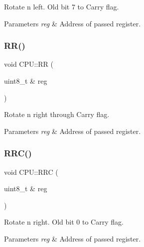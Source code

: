 Rotate n left. Old bit 7 to Carry flag. 


\begin{DoxyParams}{Parameters}
{\em reg} & Address of passed register. \\
\hline
\end{DoxyParams}
\mbox{\label{classCPU_ac1b7b67195fe563523a634dd0d6cbc17}} 
\subsubsection{\texorpdfstring{R\+R()}{RR()}}
{\footnotesize\ttfamily void C\+P\+U\+::\+RR (\begin{DoxyParamCaption}\item[{uint8\+\_\+t \&}]{reg }\end{DoxyParamCaption})\hspace{0.3cm}{\ttfamily [private]}}



Rotate n right through Carry flag. 


\begin{DoxyParams}{Parameters}
{\em reg} & Address of passed register. \\
\hline
\end{DoxyParams}
\mbox{\label{classCPU_a7d31c3685ebb8b751d9e7a2c92c03fc1}} 
\subsubsection{\texorpdfstring{R\+R\+C()}{RRC()}}
{\footnotesize\ttfamily void C\+P\+U\+::\+R\+RC (\begin{DoxyParamCaption}\item[{uint8\+\_\+t \&}]{reg }\end{DoxyParamCaption})\hspace{0.3cm}{\ttfamily [private]}}



Rotate n right. Old bit 0 to Carry flag. 


\begin{DoxyParams}{Parameters}
{\em reg} & Address of passed register. \\
\hline
\end{DoxyParams}
\mbox{\label{classCPU_a50f5edddbc08725e4377c8aaa147b558}} 
